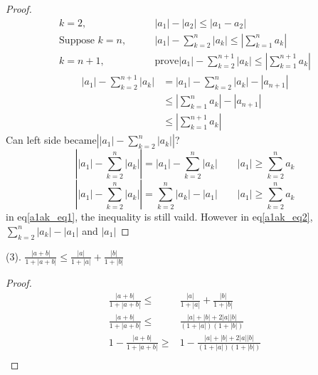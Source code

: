 \begin{example}
\begin{proof}
		\begin{align*}
			k=2,\qquad&|a_1| - |a_2| \leqslant |a_1-a_2|\\
			\text{Suppose } k = n, \qquad & |a_1| - \sum_{k=2}^n |a_k| \leqslant |\sum_{k=1}^n a_k| \\
			k = n+1, \qquad& \text{prove}|a_1| - \sum_{k=2}^{n+1} |a_k| \leqslant |\sum_{k=1}^{n+1} a_k|
		\end{align*}
		\begin{align*}
			|a_1| - \sum_{k=2}^{n+1} |a_k| 
			&= |a_1| - \sum_{k=2}^{n} |a_k| - |a_{n+1}| \\
			&\leqslant |\sum_{k=1}^n a_k| - |a_{n+1}| \\
			&\leqslant |\sum_{k=1}^{n+1} a_k|
		\end{align*}
		Can left side became$ \left| |a_1| - \sum_{k=2}^n|a_k|\right| $?
		\begin{equation}\label{a1ak_eq1}
			\left| |a_1| - \sum_{k=2}^n|a_k|\right| = |a_1| - \sum_{k=2}^n|a_k| \qquad |a_1| \ge\sum_{k=2}^n a_k
		\end{equation}
		\begin{equation}\label{a1ak_eq2}
			\left| |a_1| - \sum_{k=2}^n|a_k|\right| = \sum_{k=2}^n|a_k| - |a_1| \qquad |a_1| \ge\sum_{k=2}^n a_k
		\end{equation}
		in eq\ref{a1ak_eq1}, the inequality is still vaild. However in eq\ref{a1ak_eq2}, $ \sum_{k=2}^n |a_k| - |a_1| $ and $ |a_1| $
	\end{proof}
	(3). $\frac{|a+b|}{1+|a+b|}\leqslant \frac{|a|}{1+|a|} + \frac{|b|}{1+|b|} $
	\begin{proof}
	\begin{align*}
		\frac{|a+b|}{1+|a+b|}\leqslant &\frac{|a|}{1+|a|} + \frac{|b|}{1+|b|}\\
		\frac{|a+b|}{1+|a+b|}\leqslant &\frac{|a|+|b|+2|a||b|}{(1+|a|)(1+|b|)}\\
		1-\frac{|a+b|}{1+|a+b|}\ge &1-\frac{|a|+|b|+2|a||b|}{(1+|a|)(1+|b|)}\\

\end{align*}
\end{proof}
\end{example}
